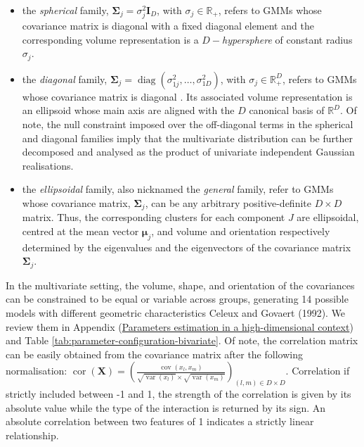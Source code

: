 \begin{itemize}
\tightlist
\item
  the \emph{spherical} family, \(\boldsymbol{\Sigma}_j=\sigma_j^2 \boldsymbol{I}_D\), with \(\sigma_j \in \mathbb{R}_{+}\), refers to GMMs whose covariance matrix is diagonal with a fixed diagonal element and the corresponding volume representation is a \(D-\)\emph{hypersphere} of constant radius \(\sigma_j\).
\item
  the \emph{diagonal} family, \(\boldsymbol{\Sigma}_j=\operatorname{diag} \left(\sigma_{1j}^2, \ldots, \sigma_{1D}^2\right)\), with \(\sigma_j \in \mathbb{R}_{+}^D\), refers to GMMs whose covariance matrix is diagonal . Its associated volume representation is an ellipsoid whose main axis are aligned with the \(D\) canonical basis of \(\mathbb{R}^D\). Of note, the null constraint imposed over the off-diagonal terms in the spherical and diagonal families imply that the multivariate distribution can be further decomposed and analysed as the product of univariate independent Gaussian realisations.
\item
  the \emph{ellipsoidal} family, also nicknamed the \emph{general} family, refer to GMMs whose covariance matrix, \(\boldsymbol{\Sigma}_j\), can be any arbitrary positive-definite \(D \times D\) matrix. Thus, the corresponding clusters for each component \(J\) are ellipsoidal, centred at the mean vector \(\boldsymbol{\mu}_j\), and volume and orientation respectively determined by the eigenvalues and the eigenvectors of the covariance matrix \(\boldsymbol{\Sigma}_j\).
\end{itemize}

In the multivariate setting, the volume, shape, and orientation of the covariances can be constrained to be equal or variable across groups, generating 14 possible models with different geometric characteristics Celeux and Govaert (1992). We review them in Appendix (\protect\hyperlink{parameters-estimation-in-a-high-dimensional-context}{Parameters estimation in a high-dimensional context}) and Table \ref{tab:parameter-configuration-bivariate}. Of note, the
correlation matrix can be easily obtained from the covariance
matrix after the following normalisation:
\(\operatorname{cor}(\boldsymbol{X})=\left(\frac{\operatorname{cov}(x_l, x_m)}{\sqrt{\operatorname{var}(x_l)} \times \sqrt{\operatorname{var}(x_m)}}\right)_{(l,m) \in D \times D}\). Correlation if strictly included between -1 and 1, the strength of the
correlation is given by its absolute value while the type of the
interaction is returned by its sign. An absolute correlation between two features of 1 indicates a strictly linear relationship.

